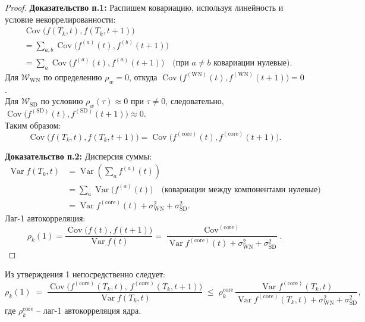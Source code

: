 \documentclass[14pt,a4paper]{article}
\begin{document}
\begin{proof}
\textbf{Доказательство п.1:}
Распишем ковариацию, используя линейность и условие некоррелированности:
\[
\begin{aligned}
&\operatorname{Cov}\bigl(f(T_k,t), f(T_k,t+1)\bigr) \\
&= \sum_{a,b} \operatorname{Cov}\bigl(f^{(a)}(t), f^{(b)}(t+1)\bigr) \\
&= \sum_{a} \operatorname{Cov}\bigl(f^{(a)}(t), f^{(a)}(t+1)\bigr) \quad \text{(при \(a \neq b\) ковариации нулевые)}.
\end{aligned}
\]
Для \(\mathcal{W}_{\mathrm{WN}}\) по определению \(\rho_w = 0\), откуда \(\operatorname{Cov}\bigl(f^{(\mathrm{WN})}(t), f^{(\mathrm{WN})}(t+1)\bigr) = 0\). \\
Для \(\mathcal{W}_{\mathrm{SD}}\) по условию \(\rho_w(\tau) \approx 0\) при \(\tau \neq 0\), следовательно, \(\operatorname{Cov}\bigl(f^{(\mathrm{SD})}(t), f^{(\mathrm{SD})}(t+1)\bigr) \approx 0\). \\
Таким образом:
\[
\operatorname{Cov}\bigl(f(T_k,t), f(T_k,t+1)\bigr) = \operatorname{Cov}\bigl(f^{(\mathrm{core})}(t), f^{(\mathrm{core})}(t+1)\bigr).
\]

\textbf{Доказательство п.2:}
Дисперсия суммы:
\[
\begin{aligned}
\operatorname{Var} f(T_k,t) 
&= \operatorname{Var}\left( \sum_{a} f^{(a)}(t) \right) \\
&= \sum_{a} \operatorname{Var}\bigl(f^{(a)}(t)\bigr) \quad \text{(ковариации между компонентами нулевые)} \\
&= \operatorname{Var} f^{(\mathrm{core})}(t) + \sigma_{\mathrm{WN}}^{2} + \sigma_{\mathrm{SD}}^{2}.
\end{aligned}
\]
Лаг-1 автокорреляция:
\[
\rho_k(1) = \frac{\operatorname{Cov}\bigl(f(t), f(t+1)\bigr)}{\operatorname{Var} f(t)} = \frac{\operatorname{Cov}^{(\mathrm{core})}}{\operatorname{Var} f^{(\mathrm{core})}(t) + \sigma_{\mathrm{WN}}^{2} + \sigma_{\mathrm{SD}}^{2}}.
\]
\end{proof}

Из утверждения 1 непосредственно следует:
\[
\rho_{k}(1)
\;=\;
\frac{\operatorname{Cov}\bigl(f^{(\mathrm{core})}(T_k,t),\,f^{(\mathrm{core})}(T_k,t+1)\bigr)}
     {\operatorname{Var} f(T_k,t)}
\;\le\;
\rho_{k}^{\mathrm{core}}
\,\frac{\operatorname{Var} f^{(\mathrm{core})}(T_k,t)}
       {\operatorname{Var} f^{(\mathrm{core})}(T_k,t)+\sigma_{\mathrm{WN}}^{2}+\sigma_{\mathrm{SD}}^{2}},
\]
где \(\rho_{k}^{\mathrm{core}}\) – лаг-1 автокорреляция ядра.
\end{document}

